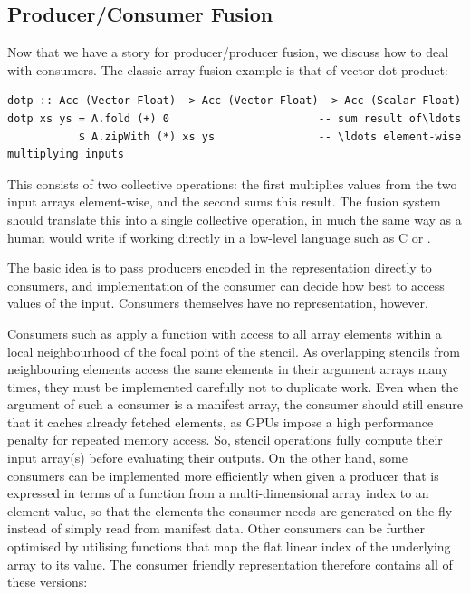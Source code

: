\subsection{Producer/Consumer Fusion}
\label{sec:producer_consumer_fusion}

Now that we have a story for producer/producer fusion, we discuss how to deal
with consumers. The classic array fusion example is that of vector dot product:

\begin{lstlisting}[style=haskell]
dotp :: Acc (Vector Float) -> Acc (Vector Float) -> Acc (Scalar Float)
dotp xs ys = A.fold (+) 0                       -- sum result of\ldots
           $ A.zipWith (*) xs ys                -- \ldots element-wise multiplying inputs
\end{lstlisting}
%
This consists of two collective operations: the first multiplies values from the
two input arrays element-wise, and the second sums this result. The fusion
system should translate this into a single collective operation, in much the
same way as a human would write if working directly in a low-level language such
as C or \CUDA.

The basic idea is to pass producers encoded in the 
representation directly to consumers, and implementation of the consumer can
decide how best to access values of the input. Consumers themselves have no
 representation, however.

Consumers such as  apply a function with access to all array
elements within a local neighbourhood of the focal point of the stencil. As
overlapping stencils from neighbouring elements access the same elements in
their argument arrays many times, they must be implemented carefully not to
duplicate work. Even when the argument of such a consumer is a manifest array,
the consumer should still ensure that it caches already fetched elements, as
GPUs impose a high performance penalty for repeated memory access. So, stencil
operations fully compute their input array(s) before evaluating their outputs.
On the other hand, some consumers can be implemented more efficiently when given
a producer that is expressed in terms of a function from a multi-dimensional
array index to an element value, so that the elements the consumer needs are
generated on-the-fly instead of simply read from manifest data. Other consumers
can be further optimised by utilising functions that map the flat linear index
of the underlying array to its value. The consumer friendly representation
therefore contains all of these versions:

